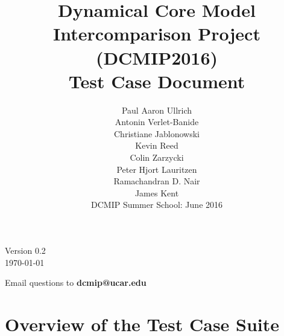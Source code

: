 \documentclass[times,doublespace]{fldauth}
\begin{document}
\setcounter{section}{-1}

\title{Dynamical Core Model Intercomparison Project (DCMIP2016) \\
 Test Case Document}
\author{Paul Aaron Ullrich \\Antonin Verlet-Banide\\ Christiane Jablonowski \\ Kevin Reed \\ Colin Zarzycki \\ Peter Hjort Lauritzen \\ Ramachandran D. Nair \\ James Kent \\ \vspace{3cm} DCMIP Summer School: June 2016}

\maketitle

\begin{center}
Version 0.2 \\
\today
\end{center}

\vspace{2cm}

\begin{center}
Email questions to \textbf{dcmip@ucar.edu}
\end{center}

\clearpage

\section*{Overview of the Test Case Suite}
\end{document}
